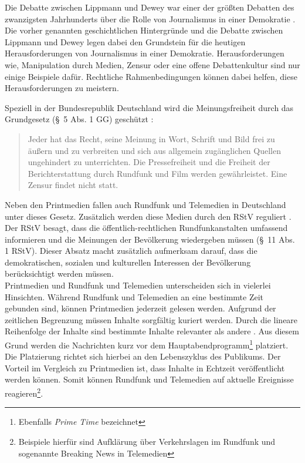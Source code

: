 Die Debatte zwischen Lippmann und Dewey war einer der größten Debatten des zwanzigsten Jahrhunderts über die Rolle von Journalismus in einer Demokratie \cite{lippmann-dewey-debate}.
Die vorher genannten geschichtlichen Hintergründe und die Debatte zwischen Lippmann und Dewey legen dabei den Grundstein für die heutigen Herausforderungen von Journalismus in einer Demokratie.
Herausforderungen wie, Manipulation durch Medien, Zensur oder eine offene Debattenkultur sind nur einige Beispiele dafür.
Rechtliche Rahmenbedingungen können dabei helfen, diese Herausforderungen zu meistern.

Speziell in der Bundesrepublik Deutschland wird die Meinungsfreiheit durch das Grundgesetz (§ 5 Abs. 1 GG) geschützt \cite{gg}:
\begin{quote}
    \glqq Jeder hat das Recht, seine Meinung in Wort, Schrift und Bild frei zu äußern und zu verbreiten und sich aus allgemein zugänglichen Quellen ungehindert zu unterrichten.
    Die Pressefreiheit und die Freiheit der Berichterstattung durch Rundfunk und Film werden gewährleistet.
    Eine Zensur findet nicht statt.\grqq{}
\end{quote}
Neben den Printmedien fallen auch Rundfunk und Telemedien in Deutschland unter dieses Gesetz.
Zusätzlich werden diese Medien durch den \ac{RStV} reguliert \cite{rundfunkstaatsvertrag}.
Der \ac{RStV} besagt, dass die öffentlich-rechtlichen Rundfunkanstalten umfassend informieren und die Meinungen der Bevölkerung wiedergeben müssen (§ 11 Abs. 1 \ac{RStV}).
Dieser Absatz macht zusätzlich aufmerksam darauf, dass die demokratischen, sozialen und kulturellen Interessen der Bevölkerung berücksichtigt werden müssen. \\

Printmedien und Rundfunk und Telemedien unterscheiden sich in vielerlei Hinsichten.
Während Rundfunk und Telemedien an eine bestimmte Zeit gebunden sind, können Printmedien jederzeit gelesen werden.
Aufgrund der zeitlichen Begrenzung müssen Inhalte sorgfältig kuriert werden.
Durch die lineare Reihenfolge der Inhalte sind bestimmte Inhalte relevanter als andere \cite{rundfunk}.
Aus diesem Grund werden die Nachrichten kurz vor dem Hauptabendprogramm\footnote{Ebenfalls \textit{Prime Time} bezeichnet} platziert.
Die Platzierung richtet sich hierbei an den Lebenszyklus des Publikums.
Der Vorteil im Vergleich zu Printmedien ist, dass Inhalte in Echtzeit veröffentlicht werden können.
Somit können Rundfunk und Telemedien auf aktuelle Ereignisse reagieren\footnote{Beispiele hierfür sind Aufklärung über Verkehrslagen im Rundfunk und sogenannte Breaking News in Telemedien}. \\

